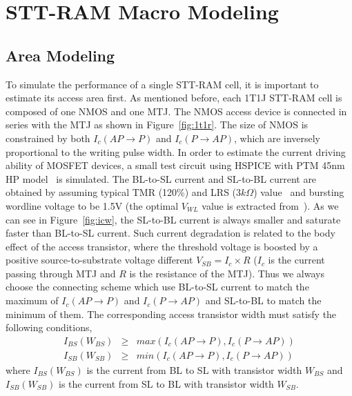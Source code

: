 \section{STT-RAM Macro Modeling} \label{sec:model}

\subsection{Area Modeling}
To simulate the performance of a single STT-RAM cell, it is important to estimate its access area first. As mentioned before, each 1T1J STT-RAM cell is composed of one NMOS and one MTJ. The NMOS access device is connected in series with the MTJ as shown in Figure~\ref{fig:1t1r}. The size of NMOS is constrained by both $I_{c}(AP\rightarrow P)$ and $I_{c}(P\rightarrow AP)$, which are inversely proportional to the writing pulse width. In order to estimate the current driving ability of MOSFET devices, a small test circuit using HSPICE with PTM 45nm HP model~\cite{PTM} is simulated. The BL-to-SL current and SL-to-BL current are obtained by assuming typical TMR (120\%) and LRS ($3k\Omega$) value~\cite{STTRAM:Qualcomm09} and bursting wordline voltage to be 1.5V (the optimal $V_{WL}$ value is extracted from~\cite{STTRAM:Gatech10}). As we can see in Figure~\ref{fig:icw}, the SL-to-BL current is always smaller and saturate faster than BL-to-SL current. Such current degradation is related to the body effect of the access transistor, where the threshold voltage is boosted by a positive source-to-substrate voltage different $V_{SB}=I_{c}\times R$ ($I_{c}$ is the current passing through MTJ and $R$ is the resistance of the MTJ). Thus we always choose the connecting scheme which use BL-to-SL current to match the maximum of $I_{c}(AP\rightarrow P)$ and $I_{c}(P\rightarrow AP)$ and SL-to-BL to match the minimum of them. The corresponding access transistor width must satisfy the following conditions,
\begin{eqnarray}
I_{BS}(W_{BS}) &\geq& max(I_{c}(AP\rightarrow P), I_{c}(P\rightarrow AP)) \\
I_{SB}(W_{SB}) &\geq& min(I_{c}(AP\rightarrow P), I_{c}(P\rightarrow AP))
\end{eqnarray}
where $I_{BS}(W_{BS})$ is the current from BL to SL with transistor width $W_{BS}$ and $I_{SB}(W_{SB})$ is the current from SL to BL with transistor width $W_{SB}$.

